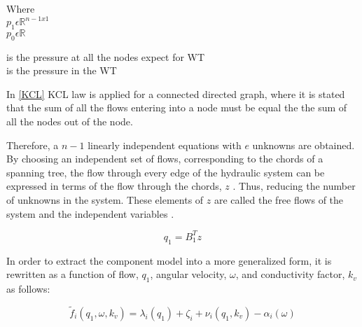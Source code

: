 \begin{minipage}[t]{0.20\textwidth}
Where\\
\hspace*{8mm} $p_1 \epsilon \mathbb{R}^{n-1x1}$  \\
\hspace*{8mm} $p_0 \epsilon \mathbb{R} $ 
\end{minipage}
\begin{minipage}[t]{0.68\textwidth}
\vspace*{2mm}
\hspace*{4mm} is the pressure at all the nodes expect for WT\\
\hspace*{4mm} is the pressure in the WT 
\end{minipage}

In \eqref{KCL} KCL law is applied for a connected directed graph, where it is stated that the sum of all the flows entering 
into a node must be equal the the sum of all the nodes out of the node.

Therefore, a $n-1$ linearly independent equations with $e$ unknowns are obtained. By choosing an independent set of flows, corresponding to the chords of a spanning tree, the 
flow through every edge of the hydraulic system can be expressed in terms of the flow through the chords, $z$ \cite{GraphModel}. Thus, reducing the
number of unknowns in the system. These elements of $z$ are called the free 
flows of the system and the independent variables \cite{GraphTheoryCarsten}.

\begin{equation}
  q_1 = B_1 ^{T}  z
  \label{ChordRelation}
\end{equation}

In order to extract the component model into a more generalized form, it is rewritten as a function of flow, $q_1$, angular velocity, $\omega$, and conductivity factor, $k_v$ as follows:

\begin{equation}
  \tilde{f}_i(q_1, \omega, k_v) = \lambda_i(q_1) + \zeta_i + \nu_i(q_1, k_v) - \alpha_i(\omega)
  \label{ComponentFunction}
\end{equation}

